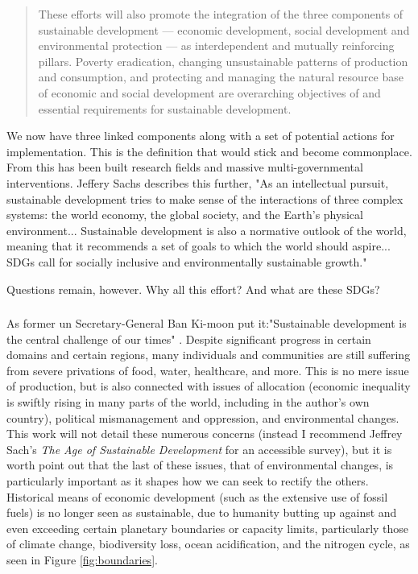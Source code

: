 \blockquote{These efforts will also promote the integration of the three components of sustainable development — economic development, social development and environmental protection — as interdependent and mutually reinforcing pillars. Poverty eradication, changing unsustainable patterns of production and
consumption, and protecting and managing the natural resource base of economic and social development are overarching objectives of and essential requirements for sustainable development.}

We now have three linked components along with a set of potential actions for implementation. This is the definition that would stick and become commonplace. From this has been built research fields and massive multi-governmental interventions. Jeffery Sachs describes this further, "As an intellectual pursuit, sustainable development tries to make sense of the interactions of three complex systems: the world economy, the global society, and the Earth's physical environment... Sustainable development is also a normative outlook of the world, meaning that it recommends a set of goals to which the world should aspire... SDGs call for socially inclusive and environmentally sustainable growth." \cite{sachsAgeSustainableDevelopment2015}

Questions remain, however. Why all this effort? And what are these SDGs?

\subsubsection{}

As former \ac{un} Secretary-General Ban Ki-moon put it:"Sustainable development is the central challenge of our times" \cite{sachsAgeSustainableDevelopment2015}. Despite significant progress in certain domains and certain regions, many individuals and communities are still suffering from severe privations of food, water, healthcare, and more. This is no mere issue of production, but is also connected with issues of allocation (economic inequality is swiftly rising in many parts of the world, including in the author's own country), political mismanagement and oppression, and environmental changes. This work will not detail these numerous concerns (instead I recommend Jeffrey Sach's \textit{The Age of Sustainable Development} for an accessible survey), but it is worth point out that the last of these issues, that of environmental changes, is particularly important as it shapes how we can seek to rectify the others. Historical means of economic development (such as the extensive use of fossil fuels) is no longer seen as sustainable, due to humanity butting up against and even exceeding certain planetary boundaries or capacity limits, particularly those of climate change, biodiversity loss, ocean acidification, and the nitrogen cycle, as seen in Figure \ref{fig:boundaries}.

